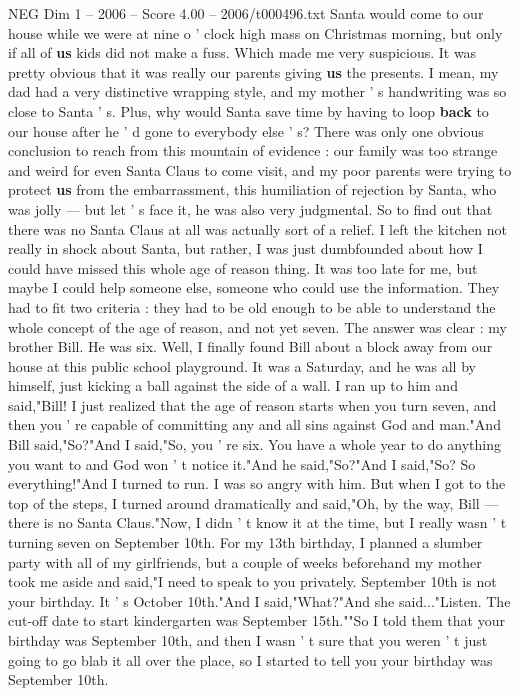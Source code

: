 \begin{textsample}{NEG Dim 1 – 2006 – Score 4.00 – 2006/t000496.txt}
Santa would come to our house while we were at nine o ' clock high mass on Christmas morning, but only if all of \textbf{us} kids did not make a fuss.
Which made me very suspicious.
It was pretty obvious that it was really our parents giving \textbf{us} the presents.
I mean, my dad had a very distinctive wrapping style, and my mother ' s handwriting was so close to Santa ' s.
Plus, why would Santa save time by having to loop \textbf{back} to our house after he ' d gone to everybody else ' s?
There was only one obvious conclusion to reach from this mountain of evidence : our family was too strange and weird for even Santa Claus to come visit, and my poor parents were trying to protect \textbf{us} from the embarrassment, this humiliation of rejection by Santa, who was jolly — but let ' s face it, he was also very judgmental.
So to find out that there was no Santa Claus at all was actually sort of a relief.
I left the kitchen not really in shock about Santa, but rather, I was just dumbfounded about how I could have missed this whole age of reason thing.
It was too late for me, but maybe I could help someone else, someone who could use the information.
They had to fit two criteria : they had to be old enough to be able to understand the whole concept of the age of reason, and not yet seven.
The answer was clear : my brother Bill.
He was six.
Well, I finally found Bill about a block away from our house at this public school playground.
It was a Saturday, and he was all by himself, just kicking a ball against the side of a wall.
I ran up to him and said,"Bill!
I just realized that the age of reason starts when you turn seven, and then you ' re capable of committing any and all sins against God and man."And Bill said,"So?"And I said,"So, you ' re six.
You have a whole year to do anything you want to and God won ' t notice it."And he said,"So?"And I said,"So?
So everything!"And I turned to run.
I was so angry with him.
But when I got to the top of the steps, I turned around dramatically and said,"Oh, by the way, Bill — there is no Santa Claus."Now, I didn ' t know it at the time, but I really wasn ' t turning seven on September 10th.
For my 13th birthday, I planned a slumber party with all of my girlfriends, but a couple of weeks beforehand my mother took me aside and said,"I need to speak to you privately.
September 10th is not your birthday.
It ' s October 10th."And I said,"What?"And she said..."Listen.
The cut-off date to start kindergarten was September 15th.""So I told them that your birthday was September 10th, and then I wasn ' t sure that you weren ' t just going to go blab it all over the place, so I started to tell you your birthday was September 10th.

\end{textsample}
